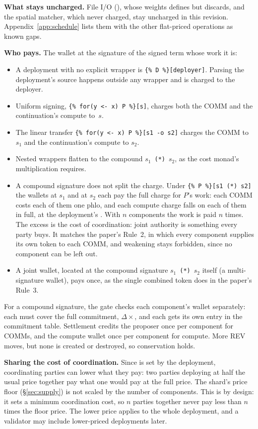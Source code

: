 \documentclass[11pt]{article}
\newcommand{\code}{\path}
\newcommand{\signed}[2]{\texttt{\{\%\,#1\,\%\}[#2]}}
\begin{document}
\textbf{What stays uncharged.} File I/O (\code{rho:io:fs:native:*}), whose weights \code{dev} defines but discards, and the spatial matcher, which \code{dev} never charged, stay uncharged in this revision. Appendix~\ref{app:schedule} lists them with the other flat-priced operations as known gaps.

\textbf{Who pays.} The wallet at the signature of the signed term whose work it is:
\begin{itemize}
\item A deployment with no explicit wrapper is \signed{D}{deployer}. Parsing the deployment's source happens outside any wrapper and is charged to the deployer.
\item Uniform signing, \signed{for(y <- x) P}{s}, charges both the COMM and the continuation's compute to~$s$.
\item The linear transfer \signed{for(y <- x) P}{s1 -o s2} charges the COMM to $s_1$ and the continuation's compute to $s_2$.
\item Nested wrappers flatten to the compound $s_1$~\texttt{(*)}~$s_2$, as the cost monad's multiplication requires.
\item A compound signature does not split the charge. Under \signed{P}{s1 (*) s2} the wallets at $s_1$ and at $s_2$ each pay the full charge for $P$'s work: each COMM costs each of them one phlo, and each compute charge falls on each of them in full, at the deployment's \code{phloPrice}. With $n$ components the work is paid $n$ times. The excess is the cost of coordination: joint authority is something every party buys. It matches the paper's Rule~2, in which every component supplies its own token to each COMM, and weakening stays forbidden, since no component can be left out.
\item A joint wallet, located at the compound signature $s_1$~\texttt{(*)}~$s_2$ itself (a multi-signature wallet), pays once, as the single combined token does in the paper's Rule~3.
\end{itemize}
For a compound signature, the gate checks each component's wallet separately: each must cover the full commitment, $\Delta \times {}$\code{phloPrice}, and each gets its own entry in the commitment table. Settlement credits the proposer once per component for COMMs, and the compute wallet once per component for compute. More REV moves, but none is created or destroyed, so conservation holds.

\textbf{Sharing the cost of coordination.} Since \code{phloPrice} is set by the deployment, coordinating parties can lower what they pay: two parties deploying at half the usual price together pay what one would pay at the full price. The shard's price floor (\S\ref{sec:supply}) is not scaled by the number of components. This is by design: it sets a minimum coordination cost, so $n$ parties together never pay less than $n$ times the floor price. The lower price applies to the whole deployment, and a validator may include lower-priced deployments later.
\end{document}
